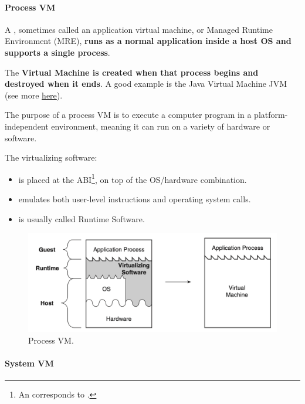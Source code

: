\newpage

\paragraph{Process VM}\label{Process VM}

A , sometimes called an application virtual machine, or Managed Runtime Environment (MRE), \textbf{runs as a normal application inside a host OS and supports a single process}. 

\highspace
The \textbf{Virtual Machine is created when that process begins and destroyed when it ends}. A good example is the Java Virtual Machine JVM (see more \href{https://en.wikipedia.org/wiki/Java_virtual_machine}{here}).

\highspace
The purpose of a process VM is to execute a computer program in a platform-independent environment, meaning it can run on a variety of hardware or software.

\highspace
The virtualizing software:
\begin{itemize}
    \item is placed at the ABI\footnote{An  corresponds to .}, on top of the OS/hardware combination.
    \item emulates both user-level instructions and operating system calls.
    \item is usually called Runtime Software.
\end{itemize}

\begin{figure}[!htp]
    \centering
    \includegraphics[width=.9\textwidth]{img/vm-2.png}
    \caption{Process VM.}
\end{figure}

\newpage

\paragraph{System VM}\label{System VM}

